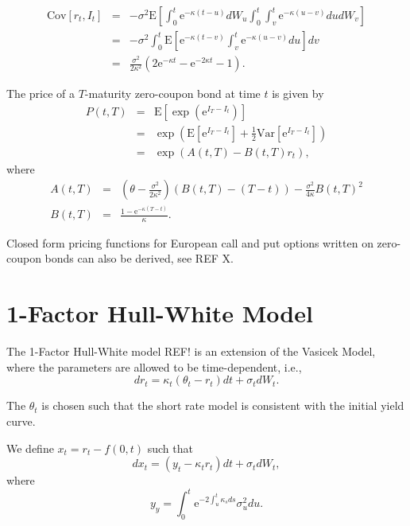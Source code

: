 \documentclass{report}
\newcommand{\E}{\mathrm{E}}
\newcommand{\Var}{\mathrm{Var}}
\newcommand{\Cov}{\mathrm{Cov}}
\newcommand{\e}{\text{e}}
\begin{document}
\begin{eqnarray}
\Cov \left[ r_t, I_t \right] &=& - \sigma^2 \E \left[ \int_0^t \e^{-\kappa (t - u)} dW_u \int_0^t \int_v^t \e^{-\kappa(u-v)} du dW_v \right] \\
&=& -\sigma^2 \int_0^t \E \left[ \e^{-\kappa(t-v)} \int_v^t \e^{-\kappa(u-v)} du \right] dv \\
&=& \frac{\sigma^2}{2 \kappa^2} \left( 2 \e^{-\kappa t} - \e^{-2\kappa t} - 1 \right).
\end{eqnarray}

The price of a $T$-maturity zero-coupon bond at time $t$ is given by
\begin{eqnarray}
P(t,T) &=& \E \left[ \exp \left(\text{e}^{I_T - I_t} \right) \right] \\
&=& \exp \left( \E \left[ \text{e}^{I_T - I_t} \right] + \frac{1}{2} \Var \left[ \text{e}^{I_T - I_t} \right] \right) \\
&=& \exp \left( A(t,T) - B(t,T) r_t \right) ,
\end{eqnarray}
where
\begin{eqnarray}
A(t,T) &=& \left( \theta - \frac{\sigma^2}{2 \kappa^2} \right) \left( B(t,T) - (T- t)\right) - \frac{\sigma^2}{4 \kappa} B(t,T)^2 \\
B(t,T) &=& \frac{1 - \text{e}^{-\kappa (T-t)}}{\kappa}.
\end{eqnarray}

Closed form pricing functions for European call and put options written on zero-coupon bonds can also be derived, see REF X.

\section{1-Factor Hull-White Model}
The 1-Factor Hull-White model REF! is an extension of the Vasicek Model, where the parameters are allowed to be time-dependent, i.e.,
\begin{equation}
dr_t = \kappa_t \left( \theta_t - r_t \right) dt + \sigma_t dW_t.
\end{equation}

The $\theta_t$ is chosen such that the short rate model is consistent with the initial yield curve.

We define $x_t = r_t - f(0,t)$ such that
\begin{equation}
dx_t = \left( y_t - \kappa_t r_t \right) dt + \sigma_t dW_t,
\label{eq:HullWhiteSDEx}
\end{equation}
where
\begin{equation}
y_y = \int_0^t \e^{-2\int_u^t \kappa_s ds} \sigma_u^2 du.
\end{equation}
\end{document}
